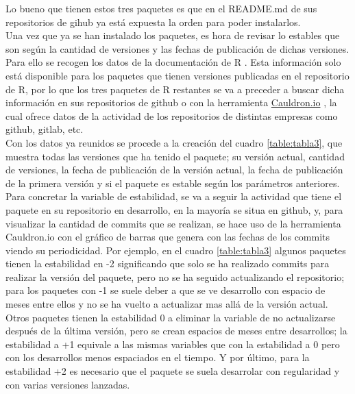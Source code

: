 \documentclass{article}\usepackage[]{graphicx}\usepackage[]{color}
\begin{document}
Lo bueno que tienen estos tres paquetes es que en el README.md de sus repositorios de gihub ya est\'a expuesta la orden para poder instalarlos.~\\
Una vez que ya se han instalado los paquetes, es hora de revisar lo estables que son seg\'un la cantidad de versiones y las fechas de publicaci\'on de dichas versiones. Para ello se recogen los datos de la documentaci\'on de R \cite{docu_r}
. Esta informaci\'on solo est\'a disponible para los paquetes que tienen versiones publicadas en el repositorio de R, por lo que los tres paquetes de R restantes se va a preceder a buscar dicha informaci\'on en sus repositorios de github o con la herramienta \href{https://cauldron.io/}{Cauldron.io} \cite{cauldron}
, la cual ofrece datos de la actividad de los repositorios de distintas empresas como github, gitlab, etc.~\\
Con los datos ya reunidos se procede a la creaci\'on del cuadro \ref{table:tabla3}, que muestra todas las versiones que ha tenido el paquete; su versi\'on actual, cantidad de versiones, la fecha de publicaci\'on de la versi\'on actual, la fecha de publicaci\'on de la primera versi\'on y si el paquete es estable seg\'un los par\'ametros anteriores.~\\
Para concretar la variable de estabilidad, se va a seguir la actividad que tiene el paquete en su repositorio en desarrollo, en la mayor\'ia se situa en github, y, para visualizar la cantidad de commits que se realizan, se hace uso de la herramienta Cauldron.io con el gr\'afico de barras que genera con las fechas de los commits viendo su periodicidad. Por ejemplo, en el cuadro \ref{table:tabla3} algunos paquetes tienen la estabilidad en -2 significando que solo se ha realizado commits para realizar la versi\'on del paquete, pero no se ha seguido actualizando el repositorio; para los paquetes con -1 se suele deber a que se ve desarrollo con espacio de meses entre ellos y no se ha vuelto a actualizar mas all\'a de la versi\'on actual. Otros paquetes tienen la estabilidad 0 a eliminar la variable de no actualizarse despu\'es de la \'ultima versi\'on, pero se crean espacios de meses entre desarrollos; la estabilidad a +1 equivale a las mismas variables que con la estabilidad a 0 pero con los desarrollos menos espaciados en el tiempo. Y por \'ultimo, para la estabilidad +2 es necesario que el paquete se suela desarrolar con regularidad y con varias versiones lanzadas.
\end{document}
